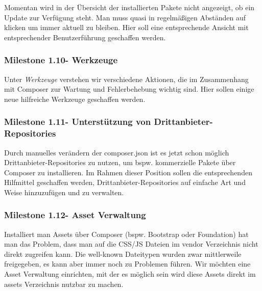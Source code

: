 \documentclass[
paper=a4,
draft=false,%
fontsize=10pt%
]{scrartcl}
\begin{document}
Momentan wird in der Übersicht der installierten Pakete nicht angezeigt, ob ein Update zur Verfügung steht. Man muss quasi in regelmäßigen Abständen auf  klicken um immer aktuell zu bleiben. Hier soll eine entsprechende Ansicht mit entsprechender Benutzerführung geschaffen werden.

\subsubsection[Milestone 1.10 - Werkzeuge]{Milestone 1.10\footnotemark - Werkzeuge}
\label{subsec:ccc-milestone-1.10}

Unter \emph{Werkzeuge} verstehen wir verschiedene Aktionen, die im Zusammenhang mit Composer zur Wartung und Fehlerbehebung wichtig sind. Hier sollen einige neue hilfreiche Werkzeuge geschaffen werden.

\subsubsection[Milestone 1.11 - Unterstützung von Drittanbieter-Repositories]{Milestone 1.11\footnotemark - Unterstützung von Drittanbieter-Repositories}
\label{subsec:ccc-milestone-1.11}

Durch manuelles verändern der composer.json ist es jetzt schon möglich Drittanbieter-Repositories zu nutzen, um bspw. kommerzielle Pakete über Composer zu installieren. Im Rahmen dieser Position sollen die entsprechenden Hilfmittel geschaffen werden, Drittanbieter-Repositories auf einfache Art und Weise hinzuzufügen und zu verwalten.

\subsubsection[Milestone 1.12 - Asset Verwaltung]{Milestone 1.12\footnotemark - Asset Verwaltung}
\label{subsec:ccc-milestone-1.12}

Installiert man Assets über Composer (bspw. Bootstrap oder Foundation) hat man das Problem, dass man auf die CSS/JS Dateien im vendor Verzeichnis nicht direkt zugreifen kann. Die well-known Dateitypen wurden zwar mittlerweile freigegeben, es kann aber immer noch zu Problemen führen. Wir möchten eine Asset Verwaltung einrichten, mit der es möglich sein wird diese Assets direkt im assets Verzeichnis nutzbar zu machen.
\end{document}

